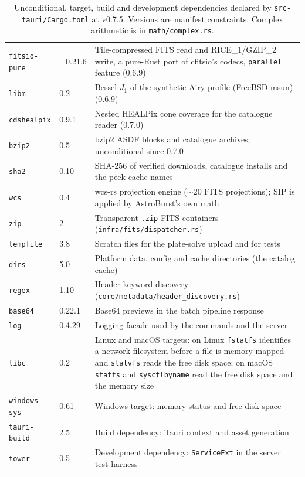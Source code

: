 \documentclass[11pt,a4paper]{article}
\newcommand{\code}[1]{\texttt{\small #1}}
\newcommand{\crate}[1]{\texttt{#1}}
\begin{document}
\begin{table}[htbp]
\begin{tabularx}{\textwidth}{llX}
    \crate{fitsio-pure} & =0.21.6 & Tile-compressed FITS read and RICE\_1/GZIP\_2 write, a pure-Rust port of cfitsio's codecs, \code{parallel} feature (0.6.9) \\
    \crate{libm} & 0.2 & Bessel $J_1$ of the synthetic Airy profile (FreeBSD msun) (0.6.9) \\
    \crate{cdshealpix} & 0.9.1 & Nested HEALPix cone coverage for the catalogue reader (0.7.0) \\
    \crate{bzip2} & 0.5 & bzip2 ASDF blocks and catalogue archives; unconditional since 0.7.0 \\
    \crate{sha2} & 0.10 & SHA-256 of verified downloads, catalogue installs and the peek cache names \\
    \crate{wcs} & 0.4 & wcs-rs projection engine ($\sim$20 FITS projections); SIP is applied by AstroBurst's own math \\
    \crate{zip} & 2 & Transparent \code{.zip} FITS containers (\code{infra/fits/dispatcher.rs}) \\
    \crate{tempfile} & 3.8 & Scratch files for the plate-solve upload and for tests \\
    \crate{dirs} & 5.0 & Platform data, config and cache directories (the catalog cache) \\
    \crate{regex} & 1.10 & Header keyword discovery (\code{core/metadata/header\_discovery.rs}) \\
    \crate{base64} & 0.22.1 & Base64 previews in the batch pipeline response \\
    \crate{log} & 0.4.29 & Logging facade used by the commands and the server \\
    \crate{libc} & 0.2 & Linux and macOS targets: on Linux \code{fstatfs} identifies a network filesystem before a file is memory-mapped and \code{statvfs} reads the free disk space; on macOS \code{statfs} and \code{sysctlbyname} read the free disk space and the memory size \\
    \crate{windows-sys} & 0.61 & Windows target: memory status and free disk space \\
    \crate{tauri-build} & 2.5 & Build dependency: Tauri context and asset generation \\
    \crate{tower} & 0.5 & Development dependency: \code{ServiceExt} in the server test harness \\
    \bottomrule
        \end{tabularx}
        \caption{Unconditional, target, build and development dependencies declared by \code{src-tauri/Cargo.toml} at v0.7.5. Versions are manifest constraints. Complex arithmetic is in \code{math/complex.rs}.}
    \end{table}
\end{document}
